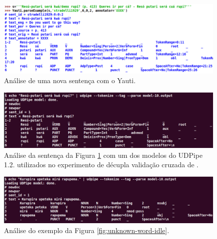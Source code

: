 \documentclass[portuguese]{textolivre}
\newcommand{\vquatro}{\textcite{de-alencar-2024-universal-k}}
\begin{document}
\begin{figure}[htbp]
  \centering
  \begin{minipage}{.75\textwidth}
    \includegraphics[width=\linewidth]{figures/yauti-stradelli.pdf}
    \caption{Análise de uma nova sentença com o Yauti.}
    \label{fig:yauti-stradelli}
  \end{minipage}
\end{figure}

\begin{figure}[htbp]
  \centering
  \begin{minipage}{.75\textwidth}
    \includegraphics[width=\linewidth]{figures/udpipe-stradelli.pdf}
    \caption{Análise da sentença da Figura \ref{fig:yauti-stradelli} com um dos modelos do UDPipe 1.2. utilizados no experimento de décupla validação cruzada de \vquatro.}
    \label{fig:udpipe-stradelli}
  \end{minipage}
\end{figure}

\begin{figure}[htbp]
  \centering
  \begin{minipage}{.75\textwidth}
    \includegraphics[width=\linewidth]{figures/udpipe-rapupema.pdf}
    \caption{Análise do exemplo da Figura \ref{fig:unknown-word-idle}.}
    \label{fig:udpipe-sapupema}
   \end{minipage}
\end{figure}
\end{document}
